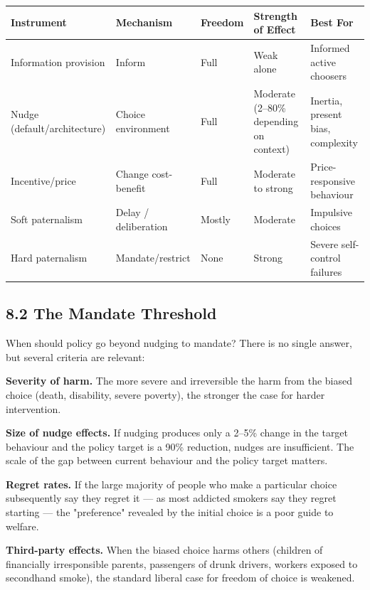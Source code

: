 \documentclass[12pt, letterpaper]{article}
\begin{document}
\begin{table}[H]
\centering
\small
\begin{tabularx}{\linewidth}{lYYYY}
\toprule
Instrument & Mechanism & Freedom & Strength of Effect & Best For \\
\midrule
Information provision & Inform & Full & Weak alone & Informed active choosers \\
Nudge (default/architecture) & Choice environment & Full & Moderate (2--80\% depending on context) & Inertia, present bias, complexity \\
Incentive/price & Change cost-benefit & Full & Moderate to strong & Price-responsive behaviour \\
Soft paternalism & Delay / deliberation & Mostly & Moderate & Impulsive choices \\
Hard paternalism & Mandate/restrict & None & Strong & Severe self-control failures \\
\bottomrule
\end{tabularx}
\end{table}



\subsection{8.2 The Mandate Threshold}


When should policy go beyond nudging to mandate? There is no single answer, but several criteria are relevant:

\textbf{Severity of harm.} The more severe and irreversible the harm from the biased choice (death, disability, severe poverty), the stronger the case for harder intervention.

\textbf{Size of nudge effects.} If nudging produces only a 2--5\% change in the target behaviour and the policy target is a 90\% reduction, nudges are insufficient. The scale of the gap between current behaviour and the policy target matters.

\textbf{Regret rates.} If the large majority of people who make a particular choice subsequently say they regret it --- as most addicted smokers say they regret starting --- the "preference" revealed by the initial choice is a poor guide to welfare.

\textbf{Third-party effects.} When the biased choice harms others (children of financially irresponsible parents, passengers of drunk drivers, workers exposed to secondhand smoke), the standard liberal case for freedom of choice is weakened.
\end{document}
